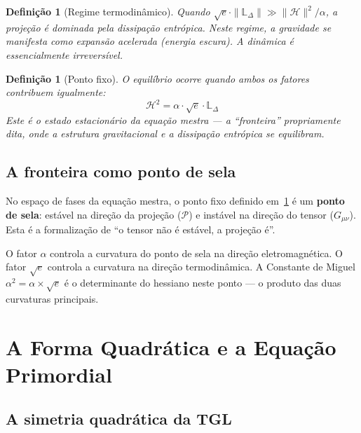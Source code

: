 \documentclass[12pt,a4paper,twoside]{article}
\newtheorem{definition}[theorem]{Definição}
\newcommand{\alphaii}{\alpha^{2}}
\begin{document}
\begin{definition}[Regime termodinâmico]
Quando $\sqrt{e} \cdot \|\mathbb{L}_\Delta\| \gg \|\mathcal{H}\|^2/\alpha$, a projeção é dominada pela dissipação entrópica. Neste regime, a gravidade se manifesta como expansão acelerada (energia escura). A dinâmica é essencialmente irreversível.
\end{definition}

\begin{definition}[Ponto fixo]
\label{def:ponto_fixo}
O equilíbrio ocorre quando ambos os fatores contribuem igualmente:
\begin{equation}
\mathcal{H}^2 = \alpha \cdot \sqrt{e} \cdot \mathbb{L}_\Delta
\end{equation}
Este é o estado estacionário da equação mestra --- a ``fronteira'' propriamente dita, onde a estrutura gravitacional e a dissipação entrópica se equilibram.
\end{definition}


\subsection{A fronteira como ponto de sela}

No espaço de fases da equação mestra, o ponto fixo definido em~\ref{def:ponto_fixo} é um \textbf{ponto de sela}: estável na direção da projeção ($\mathcal{P}$) e instável na direção do tensor ($G_{\mu\nu}$). Esta é a formalização de ``o tensor não é estável, a projeção é''.

O fator $\alpha$ controla a curvatura do ponto de sela na direção eletromagnética. O fator $\sqrt{e}$ controla a curvatura na direção termodinâmica. A Constante de Miguel $\alphaii = \alpha \times \sqrt{e}$ é o determinante do hessiano neste ponto --- o produto das duas curvaturas principais.



\section{A Forma Quadrática e a Equação Primordial}
\label{sec:quadratica}

\subsection{A simetria quadrática da TGL}
\end{document}
